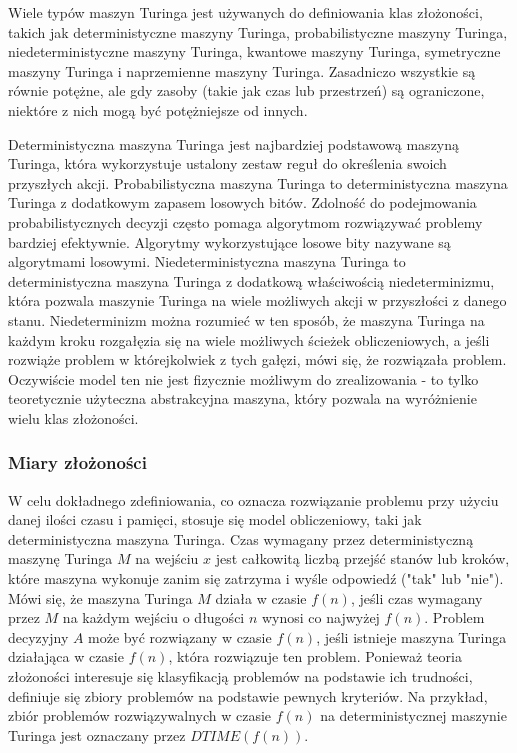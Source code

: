 Wiele typów maszyn Turinga jest używanych do definiowania klas złożoności, takich jak deterministyczne maszyny Turinga, probabilistyczne maszyny Turinga, niedeterministyczne maszyny Turinga, kwantowe maszyny Turinga, symetryczne maszyny Turinga i naprzemienne maszyny Turinga. Zasadniczo wszystkie są równie potężne, ale gdy zasoby (takie jak czas lub przestrzeń) są ograniczone, niektóre z nich mogą być potężniejsze od innych.

Deterministyczna maszyna Turinga jest najbardziej podstawową maszyną Turinga, która wykorzystuje ustalony zestaw reguł do określenia swoich przyszłych akcji. Probabilistyczna maszyna Turinga to deterministyczna maszyna Turinga z dodatkowym zapasem losowych bitów. Zdolność do podejmowania probabilistycznych decyzji często pomaga algorytmom rozwiązywać problemy bardziej efektywnie. Algorytmy wykorzystujące losowe bity nazywane są algorytmami losowymi. Niedeterministyczna maszyna Turinga to deterministyczna maszyna Turinga z dodatkową właściwością niedeterminizmu, która pozwala maszynie Turinga na wiele możliwych akcji w przyszłości z danego stanu. Niedeterminizm można rozumieć w ten sposób, że maszyna Turinga na każdym kroku rozgałęzia się na wiele możliwych ścieżek obliczeniowych, a jeśli rozwiąże problem w którejkolwiek z tych gałęzi, mówi się, że rozwiązała problem. Oczywiście model ten nie jest fizycznie możliwym do zrealizowania - to tylko teoretycznie użyteczna abstrakcyjna maszyna, który pozwala na wyróżnienie wielu klas złożoności. 

\subsubsection{Miary złożoności}
W celu dokładnego zdefiniowania, co oznacza rozwiązanie problemu przy użyciu danej ilości czasu i pamięci, stosuje się model obliczeniowy, taki jak deterministyczna maszyna Turinga. Czas wymagany przez deterministyczną maszynę Turinga $M$ na wejściu $x$ jest całkowitą liczbą przejść stanów lub kroków, które maszyna wykonuje zanim się zatrzyma i wyśle odpowiedź ("tak" lub "nie"). Mówi się, że maszyna Turinga $M$ działa w czasie $f(n)$, jeśli czas wymagany przez $M$ na każdym wejściu o długości $n$ wynosi co najwyżej $f(n)$. Problem decyzyjny $A$ może być rozwiązany w czasie $f(n)$, jeśli istnieje maszyna Turinga działająca w czasie $f(n)$, która rozwiązuje ten problem. Ponieważ teoria złożoności interesuje się klasyfikacją problemów na podstawie ich trudności, definiuje się zbiory problemów na podstawie pewnych kryteriów. Na przykład, zbiór problemów rozwiązywalnych w czasie $f(n)$ na deterministycznej maszynie Turinga jest oznaczany przez $DTIME(f(n))$.

